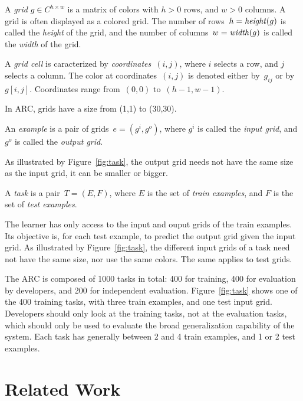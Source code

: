 \documentclass[a4paper]{llncs}
\begin{document}
\begin{definition}[grid]
  A {\em grid} $g \in C^{h \times w}$ is a matrix of colors with $h>0$
  rows, and $w>0$ columns. A grid is often displayed as a colored
  grid. The number of rows~$h = {\it height}(g)$ is called the {\em
    height} of the grid, and the number of
  columns~$w = {\it width}(g)$ is called the {\em width} of the grid.
  
  A {\em grid cell} is caracterized by {\em coordinates}~$(i,j)$,
  where $i$ selects a row, and $j$ selects a column. The color at
  coordinates~$(i,j)$ is denoted either by~$g_{ij}$ or by~$g[i,j]$.
  Coordinates range from~$(0,0)$ to~$(h-1,w-1)$.
\end{definition}

In ARC, grids have a size from (1,1) to (30,30).

\begin{definition}[example] 
  An {\em example} is a pair of grids~$e = (g^i,g^o)$, where $g^i$ is called
  the {\em input grid}, and $g^o$ is called the {\em output grid}.
\end{definition}

As illustrated by Figure~\ref{fig:task}, the output grid needs not
have the same size as the input grid, it can be smaller or bigger.

\begin{definition}[task]
  A {\em task} is a pair~$T = (E,F)$, where $E$ is the set of {\em
    train examples}, and $F$ is the set of {\em test examples}.
\end{definition}

The learner has only access to the input and ouput grids of the
train examples. Its objective is, for each test example, to predict
the output grid given the input grid.
%
As illustrated by Figure~\ref{fig:task}, the different input grids of
a task need not have the same size, nor use the same colors. The same
applies to test grids.

The ARC is composed of 1000 tasks in total: 400 for training, 400 for
evaluation by developers, and 200 for independent
evaluation. Figure~\ref{fig:task} shows one of the 400 training tasks,
with three train examples, and one test input grid. Developers should
only look at the training tasks, not at the evaluation tasks, which
should only be used to evaluate the broad generalization capability of
the system.
%
Each task has generally between 2 and 4 train examples, and 1 or 2
test examples.

\section{Related Work}
\label{related}
\end{document}
